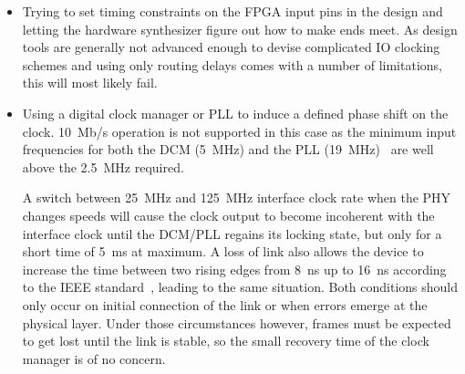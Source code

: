 \documentclass[a4paper, 11pt, oneside]{Thesis}  %
\begin{document}
\begin{itemize}
\item Trying to set timing constraints on the FPGA input pins in the design and letting the hardware synthesizer figure out how to make ends meet. As design tools are generally not advanced enough to devise complicated IO clocking schemes and using only routing delays comes with a number of limitations, this will most likely fail.
\item Using a digital clock manager or PLL to induce a defined phase shift on the clock. 10~Mb/s operation is not supported in this case as the minimum input frequencies for both the DCM (5~MHz) and the PLL (19~MHz)~\cite{S6DS} are well above the 2.5~MHz required.

A switch between 25~MHz and 125~MHz interface clock rate when the PHY changes speeds will cause the clock output to become incoherent with the interface clock until the DCM/PLL regains its locking state, but only for a short time of 5~ms at maximum. A loss of link also allows the device to increase the time between two rising edges from 8~ns up to 16~ns according to the IEEE standard~\cite{Ethernet}, leading to the same situation. Both conditions should only occur on initial connection of the link or when errors emerge at the physical layer. Under those circumstances however, frames must be expected to get lost until the link is stable, so the small recovery time of the clock manager is of no concern.


\end{itemize}
\end{document}
